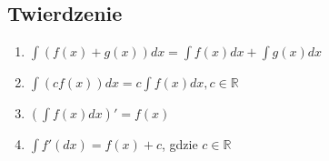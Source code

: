 \documentclass[11pt]{article}
\begin{document}
\subsection{Twierdzenie}
\label{sec:orgefedf13}
\begin{enumerate}
\item \(\displaystyle\int \left( f(x) + g(x) \right) dx = \int f(x)dx + \int g(x)dx\)
\item \(\displaystyle\int (c f(x))dx = c \int f(x) dx, c \in \mathbb{R}\)
\item \(\displaystyle \left( \int f(x) dx \right)' = f(x)\)
\item \(\displaystyle \int f'(dx) = f(x) +c\), gdzie \(c \in \mathbb{R}\)
\end{enumerate}
\end{document}

